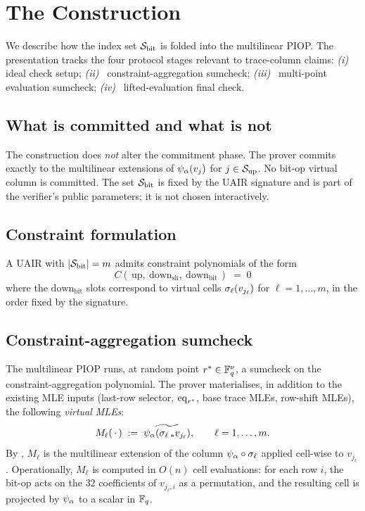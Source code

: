 \section{The Construction}
\label{sec:construction}

We describe how the index set $\mathcal{S}_{\mathrm{bit}}$ is folded into the multilinear
PIOP. The presentation tracks the four protocol stages relevant to
trace-column claims: \emph{(i)}~ ideal check setup; \emph{(ii)}~
constraint-aggregation sumcheck; \emph{(iii)}~ multi-point evaluation
sumcheck; \emph{(iv)}~ lifted-evaluation final check.

\subsection{What is committed and what is not}

The construction does \emph{not} alter the commitment phase. The
prover commits exactly to the multilinear extensions of $\psi_{\alpha}(v_j)$
for $j \in \mathcal{S}_{\mathrm{up}}$. No bit-op virtual column is committed. The set
$\mathcal{S}_{\mathrm{bit}}$ is fixed by the UAIR signature and is part of the
verifier's public parameters; it is not chosen interactively.

\subsection{Constraint formulation}

A UAIR with $|\mathcal{S}_{\mathrm{bit}}| = m$ admits constraint polynomials of the form
\[
  C\!\left(\, \mathrm{up},\ \mathrm{down}_{\mathrm{sh}},\ \mathrm{down}_{\mathrm{bit}} \,\right) \;=\; 0
\]
where the $\mathrm{down}_{\mathrm{bit}}$ slots correspond to virtual
cells $\sigma_{\ell}(v_{j_\ell})$ for $\ell = 1,\ldots,m$, in the
order fixed by the signature.

\subsection{Constraint-aggregation sumcheck}

The multilinear PIOP runs, at random point
$r^* \in \mathbb{F}_q^{\nu}$, a sumcheck on the constraint-aggregation
polynomial. The prover materialises, in addition to the existing MLE
inputs (last-row selector, $\operatorname{eq}_{r^*}$, base trace MLEs, row-shift
MLEs), the following \emph{virtual MLEs}:
\[
  M_{\ell}(\,\cdot\,) \;:=\; \widetilde{\psi_{\alpha}(\sigma_{\ell}\,_* v_{j_\ell})}, \qquad \ell = 1,\ldots,m.
\]
By , $M_{\ell}$ is the multilinear
extension of the column $\psi_{\alpha} \circ \sigma_{\ell}$ applied cell-wise
to $v_{j_\ell}$. Operationally, $M_{\ell}$ is computed in $O(n)$ cell
evaluations: for each row $i$, the bit-op acts on the $32$
coefficients of $v_{j_\ell,i}$ as a permutation, and the resulting
cell is projected by $\psi_{\alpha}$ to a scalar in $\mathbb{F}_q$.

